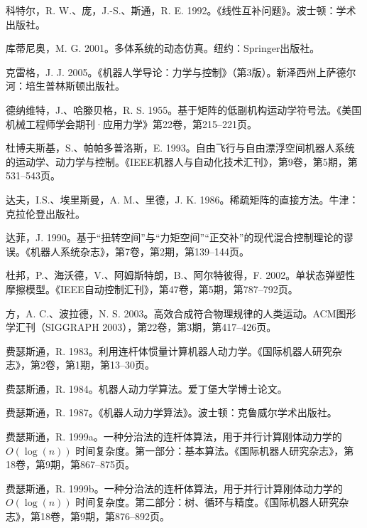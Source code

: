 \documentclass[10pt,a4paper]{book}
\theoremstyle{thmstyle} %
\theoremstyle{defstyle} %
\theoremstyle{prostyle} %
\begin{document}
科特尔，R. W.、庞，J.-S.、斯通，R. E. 1992。《线性互补问题》。波士顿：学术出版社。



库蒂尼奥，M. G. 2001。多体系统的动态仿真。纽约：Springer出版社。



克雷格，J. J. 2005。《机器人学导论：力学与控制》（第3版）。新泽西州上萨德尔河：培生普林斯顿出版社。



德纳维特，J.、哈滕贝格，R. S. 1955。基于矩阵的低副机构运动学符号法。《美国机械工程师学会期刊·应用力学》第22卷，第215–221页。



杜博夫斯基，S.、帕帕多普洛斯，E. 1993。自由飞行与自由漂浮空间机器人系统的运动学、动力学与控制。《IEEE机器人与自动化技术汇刊》，第9卷，第5期，第531–543页。



达夫，I.S.、埃里斯曼，A. M.、里德，J. K. 1986。稀疏矩阵的直接方法。牛津：克拉伦登出版社。



达菲，J. 1990。基于“扭转空间”与“力矩空间”“正交补”的现代混合控制理论的谬误。《机器人系统杂志》，第7卷，第2期，第139–144页。



杜邦，P.、海沃德，V.、阿姆斯特朗，B.、阿尔特彼得，F. 2002。单状态弹塑性摩擦模型。《IEEE自动控制汇刊》，第47卷，第5期，第787–792页。



方，A. C.、波拉德，N. S. 2003。高效合成符合物理规律的人类运动。ACM图形学汇刊（SIGGRAPH 2003），第22卷，第3期，第417–426页。



费瑟斯通，R. 1983。利用连杆体惯量计算机器人动力学。《国际机器人研究杂志》，第2卷，第1期，第13–30页。



费瑟斯通，R. 1984。机器人动力学算法。爱丁堡大学博士论文。



费瑟斯通，R. 1987。《机器人动力学算法》。波士顿：克鲁威尔学术出版社。



费瑟斯通，R. 1999a。一种分治法的连杆体算法，用于并行计算刚体动力学的 $O(\log(n))$ 时间复杂度。第一部分：基本算法。《国际机器人研究杂志》，第18卷，第9期，第867–875页。



费瑟斯通，R. 1999b。一种分治法的连杆体算法，用于并行计算刚体动力学的 $O(\log(n))$ 时间复杂度。第二部分：树、循环与精度。《国际机器人研究杂志》，第18卷，第9期，第876–892页。
\end{document}
